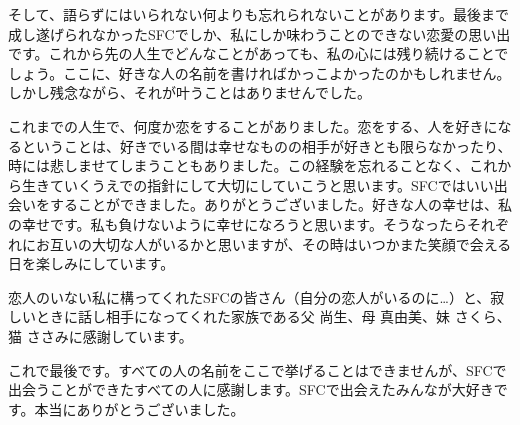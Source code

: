 そして、語らずにはいられない何よりも忘れられないことがあります。最後まで成し遂げられなかったSFCでしか、私にしか味わうことのできない恋愛の思い出です。これから先の人生でどんなことがあっても、私の心には残り続けることでしょう。ここに、好きな人の名前を書ければかっこよかったのかもしれません。しかし残念ながら、それが叶うことはありませんでした。

これまでの人生で、何度か恋をすることがありました。恋をする、人を好きになるということは、好きでいる間は幸せなものの相手が好きとも限らなかったり、時には悲しませてしまうこともありました。この経験を忘れることなく、これから生きていくうえでの指針にして大切にしていこうと思います。SFCではいい出会いをすることができました。ありがとうございました。好きな人の幸せは、私の幸せです。私も負けないように幸せになろうと思います。そうなったらそれぞれにお互いの大切な人がいるかと思いますが、その時はいつかまた笑顔で会える日を楽しみにしています。

恋人のいない私に構ってくれたSFCの皆さん（自分の恋人がいるのに…）と、寂しいときに話し相手になってくれた家族である父 尚生、母 真由美、妹 さくら、猫 ささみに感謝しています。

これで最後です。すべての人の名前をここで挙げることはできませんが、SFCで出会うことができたすべての人に感謝します。SFCで出会えたみんなが大好きです。本当にありがとうございました。
